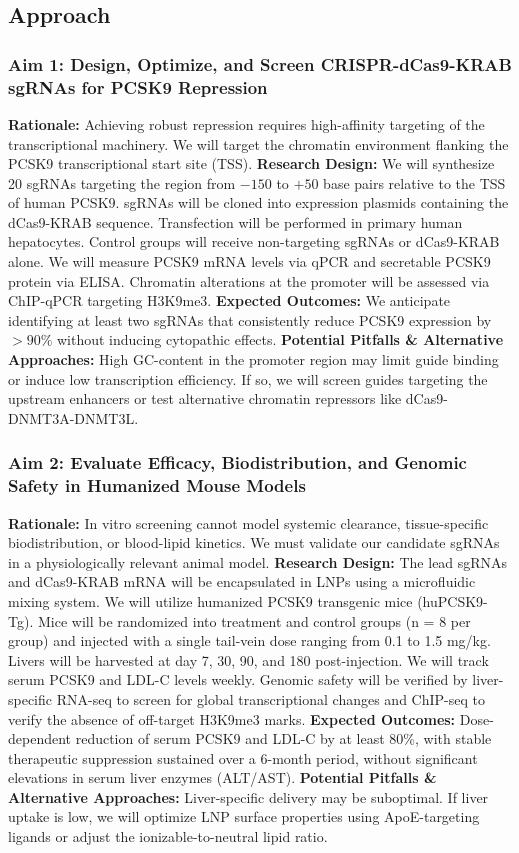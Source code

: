\documentclass[11pt]{article}
\newcommand{\p}{\vspace{1.5mm}}
\begin{document}
\p
\subsection{Approach}
\subsubsection{Aim 1: Design, Optimize, and Screen CRISPR-dCas9-KRAB sgRNAs for PCSK9 Repression}
\textbf{Rationale:} Achieving robust repression requires high-affinity targeting of the transcriptional machinery. We will target the chromatin environment flanking the PCSK9 transcriptional start site (TSS).
\textbf{Research Design:} We will synthesize 20 sgRNAs targeting the region from $-150$ to $+50$ base pairs relative to the TSS of human PCSK9. sgRNAs will be cloned into expression plasmids containing the dCas9-KRAB sequence. Transfection will be performed in primary human hepatocytes. Control groups will receive non-targeting sgRNAs or dCas9-KRAB alone. We will measure PCSK9 mRNA levels via qPCR and secretable PCSK9 protein via ELISA. Chromatin alterations at the promoter will be assessed via ChIP-qPCR targeting H3K9me3.
\textbf{Expected Outcomes:} We anticipate identifying at least two sgRNAs that consistently reduce PCSK9 expression by $>90\%$ without inducing cytopathic effects.
\textbf{Potential Pitfalls \& Alternative Approaches:} High GC-content in the promoter region may limit guide binding or induce low transcription efficiency. If so, we will screen guides targeting the upstream enhancers or test alternative chromatin repressors like dCas9-DNMT3A-DNMT3L.

\p
\subsubsection{Aim 2: Evaluate Efficacy, Biodistribution, and Genomic Safety in Humanized Mouse Models}
\textbf{Rationale:} In vitro screening cannot model systemic clearance, tissue-specific biodistribution, or blood-lipid kinetics. We must validate our candidate sgRNAs in a physiologically relevant animal model.
\textbf{Research Design:} The lead sgRNAs and dCas9-KRAB mRNA will be encapsulated in LNPs using a microfluidic mixing system. We will utilize humanized PCSK9 transgenic mice (huPCSK9-Tg). Mice will be randomized into treatment and control groups (n = 8 per group) and injected with a single tail-vein dose ranging from 0.1 to 1.5 mg/kg. Livers will be harvested at day 7, 30, 90, and 180 post-injection. We will track serum PCSK9 and LDL-C levels weekly. Genomic safety will be verified by liver-specific RNA-seq to screen for global transcriptional changes and ChIP-seq to verify the absence of off-target H3K9me3 marks.
\textbf{Expected Outcomes:} Dose-dependent reduction of serum PCSK9 and LDL-C by at least 80\%, with stable therapeutic suppression sustained over a 6-month period, without significant elevations in serum liver enzymes (ALT/AST).
\textbf{Potential Pitfalls \& Alternative Approaches:} Liver-specific delivery may be suboptimal. If liver uptake is low, we will optimize LNP surface properties using ApoE-targeting ligands or adjust the ionizable-to-neutral lipid ratio.
\end{document}
